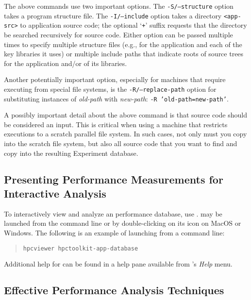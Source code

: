 \documentclass[11pt,letterpaper]{report}
\begin{document}
The above commands use two important options.
The \texttt{-S/--structure} option takes a program structure file.
The \texttt{-I/--include} option takes a directory \texttt{<app-src>} to application source code; the optional `\texttt{+}' suffix requests that the directory be searched recursively for source code.
Either option can be passed multiple times to specify multiple structure files (e.g., for the application and each of the key libraries it uses) or multiple include paths that indicate  roots of source trees for the application and/or of its libraries.

Another potentially important option, especially for machines that require executing from special file systems, is the \texttt{-R/--replace-path} option for substituting instances of \emph{old-path} with \emph{new-path}: \texttt{-R 'old-path=new-path'}.

A possibly important detail about the above command is that source code should be considered an \hpcprofAll{} input.
This is critical when using a machine that restricts executions to a scratch parallel file system.
In such cases, not only must you copy \hpcprofmpi{} into the scratch file system, but also all source code that you want \hpcprofmpi{} to find and copy into the resulting Experiment database.



\subsection{Presenting Performance Measurements for Interactive Analysis}

To interactively view and analyze an \HPCToolkit{} performance database, use \hpcviewer{}.
\hpcviewer{} may be launched from the command line or by double-clicking on its icon on MacOS or Windows.
The following is an example of launching from a command line:
\begin{quote}
  \verb|hpcviewer hpctoolkit-app-database|
\end{quote}
Additional help for \hpcviewer{} can be found in a help pane available from \hpcviewer{}'s \emph{Help} menu.


\subsection{Effective Performance Analysis Techniques}
\end{document}
